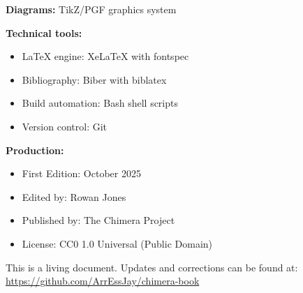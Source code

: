 \documentclass[11pt,oneside]{book}
\begin{document}
\textbf{Diagrams:} TikZ/PGF graphics system

\textbf{Technical tools:}
\begin{itemize}
\item \LaTeX{} engine: Xe\LaTeX{} with fontspec
\item Bibliography: Biber with biblatex
\item Build automation: Bash shell scripts
\item Version control: Git
\end{itemize}

\textbf{Production:}
\begin{itemize}
\item First Edition: October 2025
\item Edited by: Rowan Jones
\item Published by: The Chimera Project
\item License: CC0 1.0 Universal (Public Domain)
\end{itemize}

This is a living document. Updates and corrections can be found at:\\
\url{https://github.com/ArrEssJay/chimera-book}

\newpage
\thispagestyle{empty}

\end{document}
